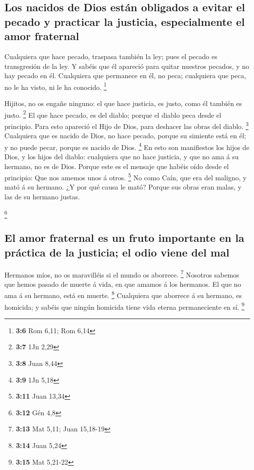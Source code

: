 \hypertarget{los-nacidos-de-dios-estuxe1n-obligados-a-evitar-el-pecado-y-practicar-la-justicia-especialmente-el-amor-fraternal}{%
\subsection{Los nacidos de Dios están obligados a evitar el pecado y
practicar la justicia, especialmente el amor
fraternal}\label{los-nacidos-de-dios-estuxe1n-obligados-a-evitar-el-pecado-y-practicar-la-justicia-especialmente-el-amor-fraternal}}

 Cualquiera que hace pecado, traspasa también la ley; pues
el pecado es transgresión de la ley.  Y sabéis que él
apareció para quitar nuestros pecados, y no hay pecado en él.
 Cualquiera que permanece en él, no peca; cualquiera que
peca, no le ha visto, ni le ha conocido. \footnote{\textbf{3:6} Rom
  6,11; Rom 6,14}

 Hijitos, no os engañe ninguno: el que hace justicia, es
justo, como él también es justo. \footnote{\textbf{3:7} 1Jn 2,29}
 El que hace pecado, es del diablo; porque el diablo peca
desde el principio. Para esto apareció el Hijo de Dios, para deshacer
las obras del diablo. \footnote{\textbf{3:8} Juan 8,44} 
Cualquiera que es nacido de Dios, no hace pecado, porque su simiente
está en él; y no puede pecar, porque es nacido de Dios. \footnote{\textbf{3:9}
  1Jn 5,18}  En esto son manifiestos los hijos de Dios, y
los hijos del diablo: cualquiera que no hace justicia, y que no ama á su
hermano, no es de Dios.  Porque este es el mensaje que
habéis oído desde el principio: Que nos amemos unos á otros. \footnote{\textbf{3:11}
  Juan 13,34}  No como Caín, que era del maligno, y mató
á su hermano. ¿Y por qué causa le mató? Porque sus obras eran malas, y
las de su hermano justas.

\footnote{\textbf{3:12} Gén 4,8}

\hypertarget{el-amor-fraternal-es-un-fruto-importante-en-la-pruxe1ctica-de-la-justicia-el-odio-viene-del-mal}{%
\subsection{El amor fraternal es un fruto importante en la práctica de
la justicia; el odio viene del
mal}\label{el-amor-fraternal-es-un-fruto-importante-en-la-pruxe1ctica-de-la-justicia-el-odio-viene-del-mal}}

 Hermanos míos, no os maravilléis si el mundo os
aborrece. \footnote{\textbf{3:13} Mat 5,11; Juan 15,18-19}
 Nosotros sabemos que hemos pasado de muerte á vida, en
que amamos á los hermanos. El que no ama á su hermano, está en muerte.
\footnote{\textbf{3:14} Juan 5,24}  Cualquiera que
aborrece á su hermano, es homicida; y sabéis que ningún homicida tiene
vida eterna permaneciente en sí. \footnote{\textbf{3:15} Mat 5,21-22}


